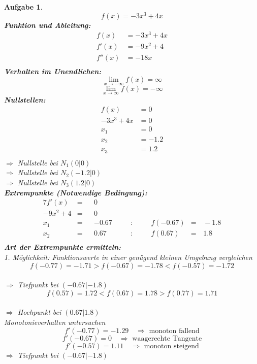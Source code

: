 \documentclass[12pt]{article}
\theoremstyle{note}
\newtheorem{aufgabe}{Aufgabe}
\begin{document}
\begin{flushleft}
\begin{aufgabe}
$$f(x)=- 3 x^{3} + 4 x$$ 
{\bf Funktion und Ableitung:} 
\begin{align*} 
f(x)&=- 3 x^{3} + 4 x\\ 
f'(x)&=- 9 x^{2} + 4\\ 
f''(x)&=- 18 x\\ 
\end{align*} 
{\bf Verhalten im Unendlichen:} 
\[ \lim_{x\rightarrow -\infty} f(x) =\infty\]\[ \lim_{x\rightarrow\infty} f(x) =-\infty\]{\bf Nullstellen:} 
\begin{align*} 
f(x)&=0 \\ 
- 3 x^{3} + 4 x&=0 \\ 
x_1&=0\\ 
x_2&=-1.2\\ 
x_3&=1.2\\ 
\end{align*} 
$\Rightarrow$ Nullstelle bei $N_1(0|0)$ \\ 
$\Rightarrow$ Nullstelle bei $N_2(-1.2|0)$ \\ 
$\Rightarrow$ Nullstelle bei $N_3(1.2|0)$ \\ 
{\bf Extrempunkte (Notwendige Bedingung):} 
\begin{alignat*}{7} 
f'(x)&=& &0& \\ 
- 9 x^{2} + 4&=& &0& \\ 
x_1&=& &-0.67& \quad &:& \quad &f(-0.67)&=& \,-1.8\\ 
x_2&=& &0.67& \quad &:& \quad &f(0.67)&=& \,1.8\\ 
\end{alignat*} 
{\bf Art der Extrempunkte ermitteln:} \\[1em] 
{\em 1. M\"oglichkeit:} Funktionswerte in einer gen\"ugend kleinen Umgebung vergleichen \\ 
$$f(-0.77)=-1.71  >  f(-0.67)=-1.78  <   f(-0.57)=-1.72$$\\ 
$\Rightarrow$ Tiefpunkt bei $(-0.67|-1.8)$ \\ 
\vspace{1em}$$f(0.57)=1.72  <  f(0.67)=1.78  >  f(0.77)=1.71$$\\ 
$\Rightarrow$ Hochpunkt bei $(0.67|1.8)$ \\ 
\vspace{1em}{\em 2. M\"oglichkeit:} Monotonieverhalten untersuchen \\ 
$$f'(-0.77)=-1.29\quad \Rightarrow \text{ monoton fallend} $$$$f'(-0.67)=0 \quad \Rightarrow \text{ waagerechte Tangente} $$$$f'(-0.57)=1.11\quad \Rightarrow \text{ monoton steigend} $$$\Rightarrow$ Tiefpunkt bei $(-0.67|-1.8)$ \\ 

\end{aufgabe}
\end{flushleft}
\end{document}
